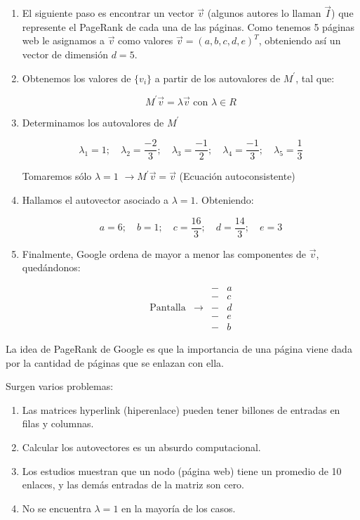 \documentclass[11pt, spanish]{report}
\begin{document}
\begin{enumerate}
\item El siguiente paso es encontrar un vector $\vec{v}$ (algunos autores lo llaman $\vec{I}$) que represente el PageRank de cada una de las páginas. Como tenemos 5 páginas web le asignamos a $\vec{v}$ como valores $\vec{v} = (a,b,c,d,e)^T$, obteniendo así un vector de dimensión $d=5$.

\item Obtenemos los valores de $\{v_i\}$ a partir de los autovalores de $M^\prime$, tal que:

\[
M^\prime \vec{v} = \lambda \vec{v} \text{ con }\lambda \in R
\]

\item Determinamos los autovalores de $M^\prime$

\[
\lambda_1 = 1; \quad \lambda_2 = \frac{-2}{3}; \quad \lambda_3 = \frac{-1}{2}; \quad \lambda_4 = \frac{-1}{3}; \quad \lambda_5 = \frac{1}{3}
\]

Tomaremos sólo $\lambda = 1$ $\rightarrow M^\prime \vec{v} = \vec{v}$ (Ecuación autoconsistente)

\item Hallamos el autovector asociado a $\lambda = 1$. Obteniendo:

\[
a = 6; \quad b = 1; \quad c = \frac{16}{3}; \quad d = \frac{14}{3}; \quad e = 3
\]

\item Finalmente, Google ordena de mayor a menor las componentes de $\vec{v}$, quedándonos:

\[
\begin{matrix}
& & - & a \\
& & - & c \\
\text{Pantalla} & \rightarrow & - & d \\
& & - & e \\
& & - & b
\end{matrix}
\]
\end{enumerate}

La idea de PageRank de Google es que la importancia de una página viene dada por
la cantidad de páginas que se enlazan con ella.

Surgen varios problemas:

\begin{enumerate}
  \item Las matrices hyperlink (hiperenlace) pueden tener billones de entradas
    en filas y columnas.
  \item Calcular los autovectores es un absurdo computacional.
  \item Los estudios muestran que un nodo (página web) tiene un promedio de 10
    enlaces, y las demás entradas de la matriz son cero.
  \item No se encuentra $\lambda = 1$ en la mayoría de los casos.
\end{enumerate}
\end{document}
